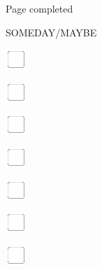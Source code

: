 \documentclass[11pt,titlepage]{article}
\begin{document}
\vspace{4mm}

\hfill Page completed \hspace{20mm}

\pagebreak

\small %
\hfill SOMEDAY/MAYBE

\vspace{6mm}

\noindent
\includegraphics[]{checkbox-4mm.pdf}

\vspace{10mm}

\noindent
\includegraphics[]{checkbox-4mm.pdf}

\vspace{10mm}

\noindent
\includegraphics[]{checkbox-4mm.pdf}

\vspace{10mm}

\noindent
\includegraphics[]{checkbox-4mm.pdf}

\vspace{10mm}

\noindent
\includegraphics[]{checkbox-4mm.pdf}

\vspace{10mm}

\noindent
\includegraphics[]{checkbox-4mm.pdf}

\vspace{10mm}

\noindent
\includegraphics[]{checkbox-4mm.pdf}
\end{document}
